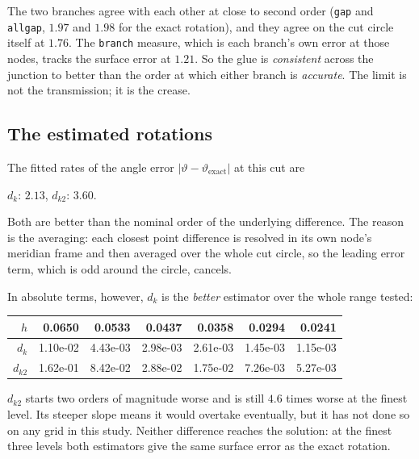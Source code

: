 The two branches agree with each other at close to second order
(\texttt{gap} and \texttt{allgap}, $1.97$ and $1.98$ for the exact
rotation), and they agree on the cut circle itself at $1.76$. The
\texttt{branch} measure, which is each branch's own error at those nodes,
tracks the surface error at $1.21$. So the glue is \emph{consistent}
across the junction to better than the order at which either branch is
\emph{accurate}. The limit is not the transmission; it is the crease.

\subsection{The estimated rotations}

The fitted rates of the angle error
$|\vartheta - \vartheta_{\mathrm{exact}}|$ at this cut are
\begin{center}
$d_k$: $2.13$, \qquad $d_{k2}$: $3.60$.
\end{center}
Both are better than the nominal order of the underlying difference. The
reason is the averaging: each closest point difference is resolved in its
own node's meridian frame and then averaged over the whole cut circle, so
the leading error term, which is odd around the circle, cancels.

In absolute terms, however, $d_k$ is the \emph{better} estimator over the
whole range tested:

\begin{center}
\small
\begin{tabular}{@{}rrrrrrr@{}}
\toprule
$h$ & 0.0650 & 0.0533 & 0.0437 & 0.0358 & 0.0294 & 0.0241 \\
\midrule
$d_k$    & 1.10e-02 & 4.43e-03 & 2.98e-03 & 2.61e-03 & 1.45e-03 & 1.15e-03 \\
$d_{k2}$ & 1.62e-01 & 8.42e-02 & 2.88e-02 & 1.75e-02 & 7.26e-03 & 5.27e-03 \\
\bottomrule
\end{tabular}
\end{center}

$d_{k2}$ starts two orders of magnitude worse and is still $4.6$ times
worse at the finest level. Its steeper slope means it would overtake
eventually, but it has not done so on any grid in this study. Neither
difference reaches the solution: at the finest three levels both
estimators give the same surface error as the exact rotation.


